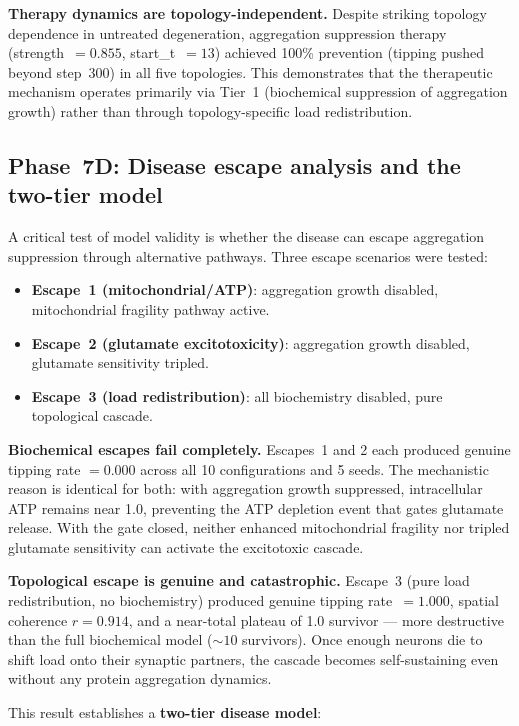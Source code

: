 \documentclass[12pt,a4paper]{article}
\begin{document}
\textbf{Therapy dynamics are topology-independent.} Despite striking topology dependence in
untreated degeneration, aggregation suppression therapy (strength~$= 0.855$, start\_t~$= 13$)
achieved 100\% prevention (tipping pushed beyond step~300) in all five topologies. This
demonstrates that the therapeutic mechanism operates primarily via Tier~1 (biochemical
suppression of aggregation growth) rather than through topology-specific load redistribution.

\subsection{Phase~7D: Disease escape analysis and the two-tier model}
\label{sec:escape}

A critical test of model validity is whether the disease can escape aggregation suppression
through alternative pathways. Three escape scenarios were tested:

\begin{itemize}
\item \textbf{Escape~1 (mitochondrial/ATP)}: aggregation growth disabled, mitochondrial
fragility pathway active.
\item \textbf{Escape~2 (glutamate excitotoxicity)}: aggregation growth disabled, glutamate
sensitivity tripled.
\item \textbf{Escape~3 (load redistribution)}: all biochemistry disabled, pure topological
cascade.
\end{itemize}

\textbf{Biochemical escapes fail completely.} Escapes~1 and 2 each produced genuine tipping
rate $= 0.000$ across all 10 configurations and 5 seeds. The mechanistic reason is identical
for both: with aggregation growth suppressed, intracellular ATP remains near 1.0, preventing
the ATP depletion event that gates glutamate release. With the gate closed, neither enhanced
mitochondrial fragility nor tripled glutamate sensitivity can activate the excitotoxic cascade.

\textbf{Topological escape is genuine and catastrophic.} Escape~3 (pure load redistribution,
no biochemistry) produced genuine tipping rate~$= 1.000$, spatial coherence $r = 0.914$, and a
near-total plateau of 1.0 survivor --- more destructive than the full biochemical model
(${\sim}10$ survivors). Once enough neurons die to shift load onto their synaptic partners, the
cascade becomes self-sustaining even without any protein aggregation dynamics.

This result establishes a \textbf{two-tier disease model}:
\end{document}
